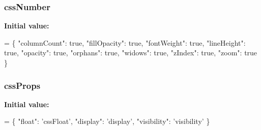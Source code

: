 \subsubsection[{\texorpdfstring{css\+Number}{cssNumber}}]{ css\+Number}\hypertarget{jquery-2_82_81-vsdoc_8js_ac1d75df6fff702cd103f92cce26e1b29}{}\label{jquery-2_82_81-vsdoc_8js_ac1d75df6fff702cd103f92cce26e1b29}
{\bfseries Initial value\+:}
\begin{DoxyCode}
= \{
        \textcolor{stringliteral}{"columnCount"}: \textcolor{keyword}{true},
        \textcolor{stringliteral}{"fillOpacity"}: \textcolor{keyword}{true},
        \textcolor{stringliteral}{"fontWeight"}: \textcolor{keyword}{true},
        \textcolor{stringliteral}{"lineHeight"}: \textcolor{keyword}{true},
        \textcolor{stringliteral}{"opacity"}: \textcolor{keyword}{true},
        \textcolor{stringliteral}{"orphans"}: \textcolor{keyword}{true},
        \textcolor{stringliteral}{"widows"}: \textcolor{keyword}{true},
        \textcolor{stringliteral}{"zIndex"}: \textcolor{keyword}{true},
        \textcolor{stringliteral}{"zoom"}: \textcolor{keyword}{true}
    \}
\end{DoxyCode}
\subsubsection[{\texorpdfstring{css\+Props}{cssProps}}]{ css\+Props}\hypertarget{jquery-2_82_81-vsdoc_8js_a5bc8f2d604bc8e8a89fe5eaf624364e1}{}\label{jquery-2_82_81-vsdoc_8js_a5bc8f2d604bc8e8a89fe5eaf624364e1}
{\bfseries Initial value\+:}
\begin{DoxyCode}
= \{
        \textcolor{stringliteral}{"float"}: \textcolor{stringliteral}{'cssFloat'},
        \textcolor{stringliteral}{"display"}: \textcolor{stringliteral}{'display'},
        \textcolor{stringliteral}{"visibility"}: \textcolor{stringliteral}{'visibility'}
    \}
\end{DoxyCode}
